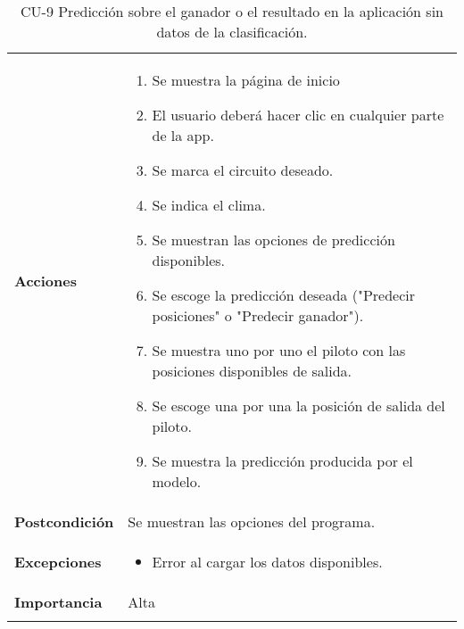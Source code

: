 \begin{longtable}[h!]{@{}ll@{}}
\begin{minipage}[t]{0.23\columnwidth}
\textbf{Acciones}\strut
\end{minipage} & \begin{minipage}[t]{0.71\columnwidth}\raggedright\strut
\begin{enumerate}
\def\labelenumi{\arabic{enumi}.}
\tightlist
\item 
  Se muestra la página de inicio
\item
  El usuario deberá hacer clic en cualquier parte de la app.
\item
  Se marca el circuito deseado.
\item
  Se indica el clima.
\item
  Se muestran las opciones de predicción disponibles.
\item
  Se escoge la predicción deseada ("Predecir posiciones" o "Predecir ganador").
\item
  Se muestra uno por uno el piloto con las posiciones disponibles de salida.
\item
  Se escoge una por una la posición de salida del piloto.
\item
  Se muestra la predicción producida por el modelo.
\end{enumerate}\strut
\end{minipage}\tabularnewline
\begin{minipage}[t]{0.23\columnwidth}\raggedright\strut
\textbf{Postcondición}\strut
\end{minipage} & \begin{minipage}[t]{0.71\columnwidth}\raggedright\strut
Se muestran las opciones del programa.\strut
\end{minipage}\tabularnewline
\begin{minipage}[t]{0.23\columnwidth}\raggedright\strut
\textbf{Excepciones}\strut
\end{minipage} & \begin{minipage}[t]{0.71\columnwidth}\raggedright\strut
\begin{itemize}
\tightlist
\item
  Error al cargar los datos disponibles.
\end{itemize}\strut
\end{minipage}\tabularnewline
\begin{minipage}[t]{0.23\columnwidth}\raggedright\strut
\textbf{Importancia}\strut
\end{minipage} & \begin{minipage}[t]{0.71\columnwidth}\raggedright\strut
Alta\strut
\end{minipage}\tabularnewline
\bottomrule
\caption{CU-9 Predicción sobre el ganador o el resultado en la aplicación sin datos de la clasificación.}
\end{longtable}